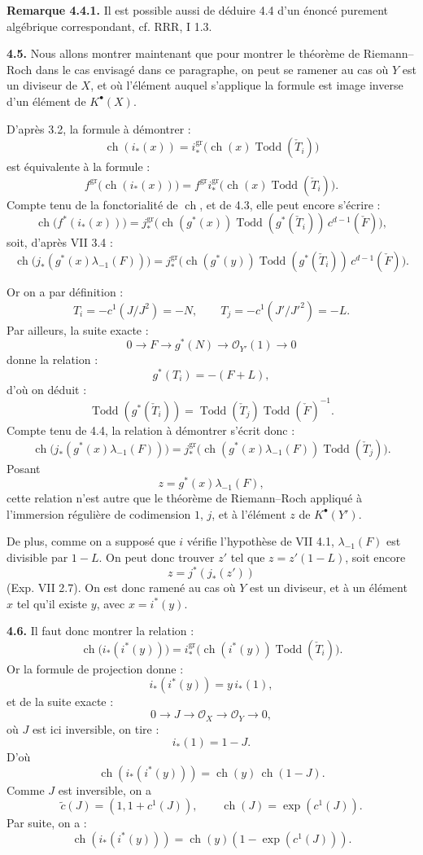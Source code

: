 \documentclass[11pt]{article}
\newcommand{\ch}{\operatorname{ch}}
\newcommand{\Todd}{\operatorname{Todd}}
\newcommand{\RRR}{\mathrm{RRR}}
\providecommand{\ch}{\operatorname{ch}}
\providecommand{\Todd}{\operatorname{Todd}}
\begin{document}
\textbf{Remarque 4.4.1.} Il est possible aussi de déduire 4.4 d'un énoncé purement algébrique correspondant, cf. \(\RRR\), I 1.3.

\textbf{4.5.} Nous allons montrer maintenant que pour montrer le théorème de Riemann--Roch dans le cas envisagé dans ce paragraphe, on peut se ramener au cas où \(Y\) est un diviseur de \(X\), et où l'élément auquel s'applique la formule est image inverse d'un élément de \(K^{\bullet}(X)\).

D'après 3.2, la formule à démontrer :
\[
 \ch(i_*(x))=
 i^{\mathrm{gr}}_*\bigl(\ch(x)\Todd(\check T_i)\bigr)
\]
est équivalente à la formule :
\[
 f^{\mathrm{gr}}\bigl(\ch(i_*(x))\bigr)
 =
 f^{\mathrm{gr}}i^{\mathrm{gr}}_*\bigl(\ch(x)\Todd(\check T_i)\bigr).
\]
Compte tenu de la fonctorialité de \(\ch\), et de 4.3, elle peut encore s'écrire :
\[
 \ch\bigl(f^*(i_*(x))\bigr)
 =
 j^{\mathrm{gr}}_*\bigl(\ch(g^*(x))\Todd(g^*(\check T_i))\,c^{d-1}(\check F)\bigr),
\]
soit, d'après VII 3.4 :
\[
 \ch\bigl(j_*(g^*(x)\lambda_{-1}(F))\bigr)
 =
 j^{\mathrm{gr}}_*\bigl(\ch(g^*(y))\Todd(g^*(\check T_i))\,c^{d-1}(\check F)\bigr).
\]

Or on a par définition :
\[
 T_i=-c^1(J/J^2)=-N,\qquad
 T_j=-c^1(J'/J'^2)=-L.
\]
Par ailleurs, la suite exacte :
\[
0\longrightarrow F\longrightarrow g^*(N)\longrightarrow \mathcal O_{Y'}(1)\longrightarrow0
\]
donne la relation :
\[
 g^*(T_i)=-(F+L),
\]
d'où on déduit :
\[
 \Todd(g^*(\check T_i))=\Todd(\check T_j)\Todd(\check F)^{-1}.
\]
Compte tenu de 4.4, la relation à démontrer s'écrit donc :
\[
 \ch\bigl(j_*(g^*(x)\lambda_{-1}(F))\bigr)
 =
 j^{\mathrm{gr}}_*\bigl(\ch(g^*(x)\lambda_{-1}(F))\Todd(\check T_j)\bigr).
\]
Posant
\[
z=g^*(x)\lambda_{-1}(F),
\]
cette relation n'est autre que le théorème de Riemann--Roch appliqué à l'immersion régulière de codimension \(1\), \(j\), et à l'élément \(z\) de \(K^{\bullet}(Y')\).

De plus, comme on a supposé que \(i\) vérifie l'hypothèse de VII 4.1, \(\lambda_{-1}(F)\) est divisible par \(1-L\). On peut donc trouver \(z'\) tel que \(z=z'(1-L)\), soit encore
\[
 z=j^*(j_*(z'))
\]
(Exp. VII 2.7). On est donc ramené au cas où \(Y\) est un diviseur, et à un élément \(x\) tel qu'il existe \(y\), avec \(x=i^*(y)\).

\textbf{4.6.} Il faut donc montrer la relation :
\[
 \ch\bigl(i_*(i^*(y))\bigr)
 =
 i^{\mathrm{gr}}_*\bigl(\ch(i^*(y))\Todd(\check T_i)\bigr).
\]
Or la formule de projection donne :
\[
 i_*(i^*(y))=y\,i_*(1),
\]
et de la suite exacte :
\[
0\longrightarrow J\longrightarrow\mathcal O_X\longrightarrow\mathcal O_Y\longrightarrow0,
\]
où \(J\) est ici inversible, on tire :
\[
 i_*(1)=1-J.
\]
D'où
\[
 \ch(i_*(i^*(y)))=\ch(y)\,\ch(1-J).
\]
Comme \(J\) est inversible, on a
\[
 \widetilde c(J)=(1,1+c^1(J)),\qquad \ch(J)=\exp(c^1(J)).
\]
Par suite, on a :
\[
 \ch(i_*(i^*(y)))=\ch(y)(1-\exp(c^1(J))).
\]
\end{document}
